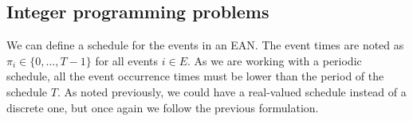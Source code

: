 \documentclass[english, 12pt, a4paper, sci, utf8, a-2b, online]{aaltothesis}
\begin{document}





\subsection{Integer programming problems}

We can define a schedule for the events in an EAN. The event times are noted as $\pi_i \in \{0, \dots, T-1\}$ for all events $i \in E$. As we are working with a periodic schedule, all the event occurrence times must be lower than the period of the schedule $T$. As noted previously, we could have a real-valued schedule instead of a discrete one, but once again we follow the previous formulation.
\end{document}
